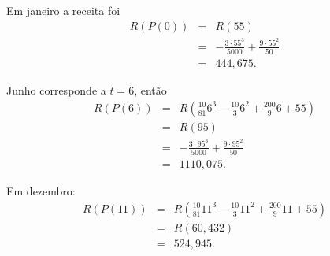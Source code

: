 Em janeiro a receita foi
\begin{eqnarray*}
	R(P(0))
	& = & R(55)\\
	& = & -\frac{3\cdot55^3}{5000}+\frac{9\cdot55^2}{50}\\
	& = & 444,675.
\end{eqnarray*}

Junho corresponde a $t=6$, então
\begin{eqnarray*}
	R(P(6))
	& = & R\left(\frac{10}{81}6^3-\frac{10}{3}6^2+\frac{200}{9}6+55\right)\\
	& = & R(95)\\
	& = & -\frac{3\cdot95^3}{5000}+\frac{9\cdot95^2}{50}\\
	& = & 1110,075.
\end{eqnarray*}

Em dezembro:
\begin{eqnarray*}
	R(P(11))
	& = & R\left(\frac{10}{81}11^3-\frac{10}{3}11^2+\frac{200}{9}11+55\right)\\
	& = & R(60,432)\\
	& = & 524,945.
\end{eqnarray*}

